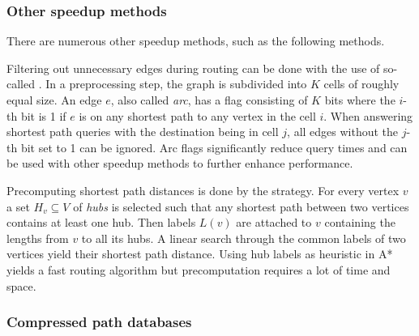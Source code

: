		\subsubsection{Other speedup methods}
		\label{subsubsec:other-speedup-methods}
		
			There are numerous other speedup methods, such as the following methods.
			
			Filtering out unnecessary edges during routing can be done with the use of so-called \cite{bast-transportation-networks}.
			In a preprocessing step, the graph is subdivided into $K$ cells of roughly equal size.
			An edge $e$, also called \emph{arc}, has a flag consisting of $K$ bits where the $i$-th bit is 1 if $e$ is on any shortest path to any vertex in the cell $i$.
			When answering shortest path queries with the destination being in cell $j$, all edges without the $j$-th bit set to 1 can be ignored.
			Arc flags significantly reduce query times and can be used with other speedup methods to further enhance performance.
			
			Precomputing shortest path distances is done by the  strategy\cite{bast-transportation-networks}.
			For every vertex $v$ a set $H_v \subseteq V$ of \emph{hubs} is selected such that any shortest path between two vertices contains at least one hub.
			Then labels $L(v)$ are attached to $v$ containing the lengths from $v$ to all its hubs.
			A linear search through the common labels of two vertices yield their shortest path distance.
			Using hub labels as heuristic in A* yields a fast routing algorithm but precomputation requires a lot of time and space.
		
		\subsubsection{Compressed path databases}
		\label{subsubsec:cpd}
		

